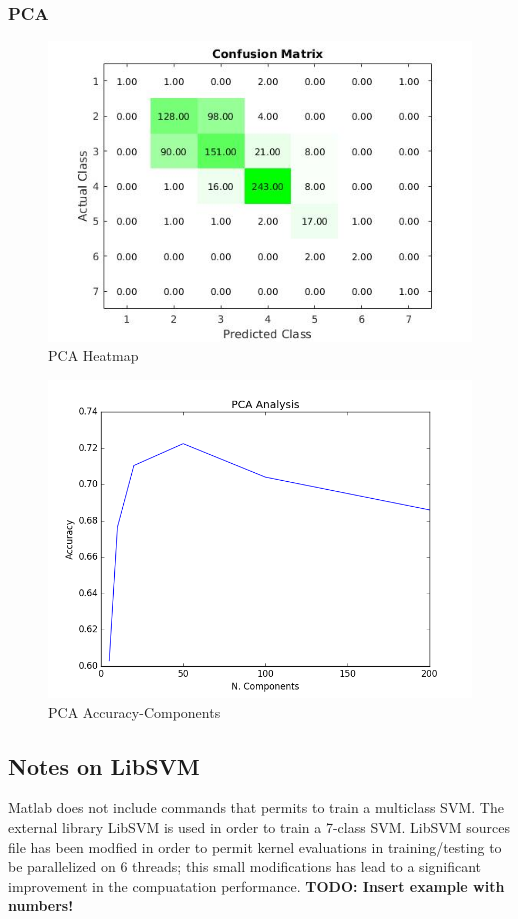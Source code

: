 \documentclass[a4paper,10pt]{article}
\begin{document}
     \subsubsection{PCA}
      \begin{figure}[H]
	\centering
	\includegraphics[scale=0.5]{pca-heat.jpg}
	\caption{PCA Heatmap}
      \end{figure}
      
      \begin{figure}[H]
	\centering
	\includegraphics[scale=0.5]{pca-acc.png}
	\caption{PCA Accuracy-Components}
      \end{figure}

  \subsection{Notes on LibSVM}
    Matlab does not include commands that permits to train a multiclass SVM. The external library LibSVM \cite{libsvm} is used in order
    to train a 7-class SVM. LibSVM sources file has been modfied \cite{openmpsvm} in order to permit kernel evaluations in training/testing
    to be parallelized on 6 threads; this small modifications has lead to a significant improvement in the compuatation performance.\newline
    \textbf{TODO: Insert example with numbers!}
    
\end{document}
